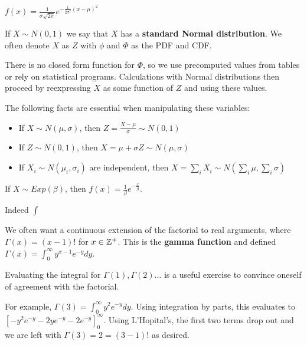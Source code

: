\documentclass[10pt]{article}
\begin{document}
\begin{definition}
    $f(x) = \frac{1}{\sigma \sqrt{2\pi}}e^{-\frac{1}{2\sigma^2}(x-\mu)^2}$
\end{definition}

\begin{note}
    If $X \sim N(0, 1)$ we say that $X$ has a \textbf{standard Normal
    distribution}. We often denote $X$ as $Z$ with $\phi$ and $\Phi$ as the
    PDF and CDF.

    There is no closed form function for $\Phi$, so we use precomputed values
    from tables or rely on statistical programs. Calculations with Normal
    distributions then proceed by reexpressing $X$ as some function of $Z$ and
    using these values.
\end{note}

The following facts are essential when manipulating these variables:

\begin{itemize}
\item{If $X \sim N(\mu, \sigma)$, then $Z = \frac{X - \mu}{\sigma} \sim N(0, 1)$}
\item{If $Z \sim N(0, 1)$, then $X = \mu + \sigma Z \sim N(\mu, \sigma)$}
\item{If $X_i \sim N(\mu_i, \sigma_i)$ are independent, then $X = \sum_i X_i \sim N(\sum_i \mu, \sum_i \sigma)$}
\end{itemize}

\begin{definition}
    If $X \sim Exp(\beta)$, then $f(x) = \frac{1}{\beta}e^{-\frac{x}{\beta}}$.
\end{definition}

Indeed $\int$

\begin{note}
    We often want a continuous extension of the factorial to real
    arguments, where $\Gamma(x) = (x-1)!$ for $x \in \mathbb{Z}^+$. This is the
    \textbf{gamma function} and defined $\Gamma(x) = \int_0^{\infty}
    y^{x-1}e^{-y}dy$.

    Evaluating the integral for $\Gamma(1), \Gamma(2) \dots$ is a useful
    exercise to convince oneself of agreement with the factorial.

    For example, $\Gamma(3) = \int_0^{\infty} y^2e^{-y} dy$. Using integration
    by parts, this evaluates to $[-y^2e^{-y} - 2ye^{-y} - 2e^{-y}]^{\infty}_0$.
    Using L'Hopital's, the first two terms drop out and we are left with
    $\Gamma(3) = 2 = (3-1)!$ as desired.
\end{note}
\end{document}
